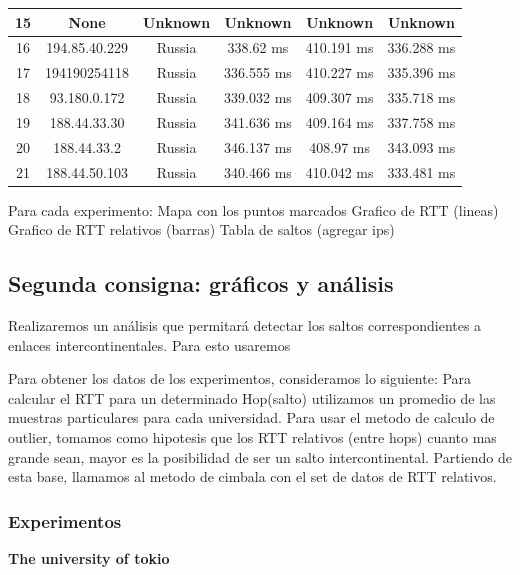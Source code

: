 \begin{table}[]
\begin{tabular}{ | c | c | c | c | c | c | }
15	&None           &     	      Unknown    &   	      Unknown     &  	      Unknown     &  	      Unknown   \\ \hline    
16	&194.85.40.229  &     	       Russia    &   	      338.62 ms   &  	     410.191 ms   &  	     336.288 ms \\ \hline    
17	&194190254118	  &     Russia       	    & 336.555 ms     	     &410.227 ms     	     &335.396 ms     \\ \hline
18	&93.180.0.172   &     	       Russia    &   	     339.032 ms   &  	     409.307 ms   &  	     335.718 ms \\ \hline    
19	&188.44.33.30   &     	       Russia    &   	     341.636 ms   &  	     409.164 ms   &  	     337.758 ms \\ \hline    
20	&188.44.33.2    &     	       Russia    &   	     346.137 ms   &  	      408.97 ms   &  	     343.093 ms \\ \hline    
21	&188.44.50.103  &     	       Russia    &   	     340.466 ms   &  	     410.042 ms   &  	     333.481 ms \\ \hline     

\end{tabular}
\end{table}
	
	Para cada experimento:
		Mapa con los puntos marcados
		Grafico de RTT (lineas)
		Grafico de RTT relativos (barras)
		Tabla de saltos (agregar ips)

		
		
\subsection{Segunda consigna: gráficos y análisis}


Realizaremos un análisis que permitará detectar los saltos correspondientes a enlaces intercontinentales. Para esto usaremos 

Para obtener los datos de los experimentos, consideramos lo siguiente:
Para calcular el RTT para un determinado Hop(salto) utilizamos un promedio de las muestras particulares para cada universidad.
Para usar el metodo de calculo de outlier, tomamos como hipotesis que los RTT relativos (entre hops) cuanto mas grande sean, mayor es la posibilidad de ser un salto intercontinental. Partiendo de esta base, llamamos al metodo de cimbala con el set de datos de RTT relativos.

\subsubsection{Experimentos}
\textbf{The university of tokio} \\

